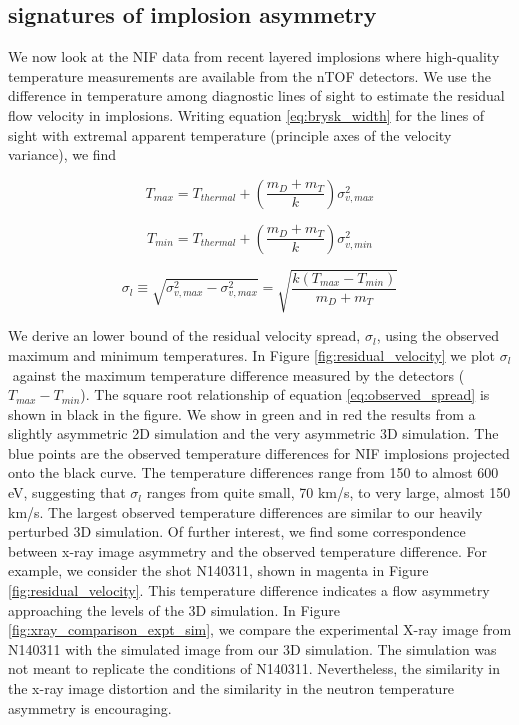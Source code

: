 \documentclass[aip,pop,numerical,reprint,floatfix]{revtex4-1}
\begin{document}
\subsection{\label{sec:sig_asym}signatures of implosion asymmetry}

We now look at the NIF data from recent layered implosions where high-quality
temperature measurements are available from the nTOF detectors. We
use the difference in temperature among diagnostic lines of sight
to estimate the residual flow velocity in implosions. Writing equation \ref{eq:brysk_width}
for the lines of sight with extremal apparent temperature (principle
axes of the velocity variance), we find 

\begin{equation}
T_{max}=T_{thermal}+\left(\frac{m_{D}+m_{T}}{k}\right)\sigma_{v,max}^{2}\label{eq:Tmax}
\end{equation}

\begin{equation}
T_{min}=T_{thermal}+\left(\frac{m_{D}+m_{T}}{k}\right)\sigma_{v,min}^{2}\label{eq:Tmin}
\end{equation}

\begin{equation}
\sigma_{l}\equiv\sqrt{\sigma_{v,max}^{2}-\sigma_{v,max}^{2}}=\sqrt{\frac{k\left(T_{max}-T_{min}\right)}{m_{D}+m_{T}}}\label{eq:observed_spread}
\end{equation}

We derive an lower bound of the residual velocity spread, $\sigma_{l}$,
using the observed maximum and minimum temperatures. In Figure \ref{fig:residual_velocity}
we plot $\sigma_{l}$ $ $ against the maximum temperature difference
measured by the detectors ($T_{max}-T_{min}$). The square root relationship
of equation \ref{eq:observed_spread} is shown in black in the figure. We show
in green and in red the results from a slightly asymmetric 2D simulation
and the very asymmetric 3D simulation. The blue points are the observed
temperature differences for NIF implosions projected onto the black
curve. The temperature differences range from 150 to almost 600 eV,
suggesting that $\sigma_{l}$ ranges from quite small, 70 km/s, to
very large, almost 150 km/s. The largest observed temperature differences
are similar to our heavily perturbed 3D simulation. Of further interest,
we find some correspondence between x-ray image asymmetry and the
observed temperature difference. For example, we consider the shot
N140311, shown in magenta in Figure \ref{fig:residual_velocity}. This temperature
difference indicates a flow asymmetry approaching the levels of the
3D simulation. In Figure \ref{fig:xray_comparison_expt_sim}, we compare
the experimental X-ray image from N140311 with the simulated image
from our 3D simulation. The simulation was not meant to replicate
the conditions of N140311. Nevertheless, the similarity in the x-ray
image distortion and the similarity in the neutron temperature asymmetry
is encouraging.
\end{document}
